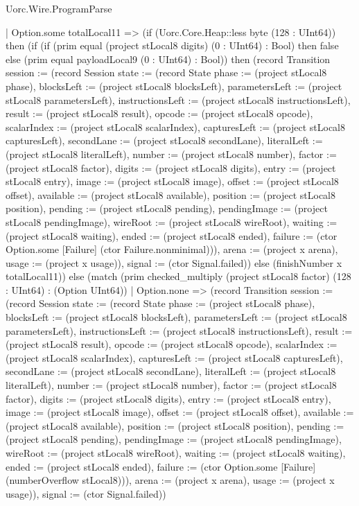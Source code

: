 \begin{lexlean}{Uorc.Wire.ProgramParse}
\begin{semanticmodule}
{      | Option.some totalLocal11 => (if (Uorc.Core.Heap::less byte (128 : UInt64)) then (if (if (prim equal (project stLocal8 digits) (0 : UInt64) : Bool) then false else (prim equal payloadLocal9 (0 : UInt64) : Bool)) then (record Transition {session := (record Session {state := (record State {phase := (project stLocal8 phase), blocksLeft := (project stLocal8 blocksLeft), parametersLeft := (project stLocal8 parametersLeft), instructionsLeft := (project stLocal8 instructionsLeft), result := (project stLocal8 result), opcode := (project stLocal8 opcode), scalarIndex := (project stLocal8 scalarIndex), capturesLeft := (project stLocal8 capturesLeft), secondLane := (project stLocal8 secondLane), literalLeft := (project stLocal8 literalLeft), number := (project stLocal8 number), factor := (project stLocal8 factor), digits := (project stLocal8 digits), entry := (project stLocal8 entry), image := (project stLocal8 image), offset := (project stLocal8 offset), available := (project stLocal8 available), position := (project stLocal8 position), pending := (project stLocal8 pending), pendingImage := (project stLocal8 pendingImage), wireRoot := (project stLocal8 wireRoot), waiting := (project stLocal8 waiting), ended := (project stLocal8 ended), failure := (ctor Option.some [Failure] (ctor Failure.nonminimal))}), arena := (project x arena), usage := (project x usage)}), signal := (ctor Signal.failed)}) else (finishNumber x totalLocal11)) else (match (prim checked_multiply (project stLocal8 factor) (128 : UInt64) : (Option UInt64))
        | Option.none => (record Transition {session := (record Session {state := (record State {phase := (project stLocal8 phase), blocksLeft := (project stLocal8 blocksLeft), parametersLeft := (project stLocal8 parametersLeft), instructionsLeft := (project stLocal8 instructionsLeft), result := (project stLocal8 result), opcode := (project stLocal8 opcode), scalarIndex := (project stLocal8 scalarIndex), capturesLeft := (project stLocal8 capturesLeft), secondLane := (project stLocal8 secondLane), literalLeft := (project stLocal8 literalLeft), number := (project stLocal8 number), factor := (project stLocal8 factor), digits := (project stLocal8 digits), entry := (project stLocal8 entry), image := (project stLocal8 image), offset := (project stLocal8 offset), available := (project stLocal8 available), position := (project stLocal8 position), pending := (project stLocal8 pending), pendingImage := (project stLocal8 pendingImage), wireRoot := (project stLocal8 wireRoot), waiting := (project stLocal8 waiting), ended := (project stLocal8 ended), failure := (ctor Option.some [Failure] (numberOverflow stLocal8))}), arena := (project x arena), usage := (project x usage)}), signal := (ctor Signal.failed)})
}
\end{semanticmodule}
\end{lexlean}
